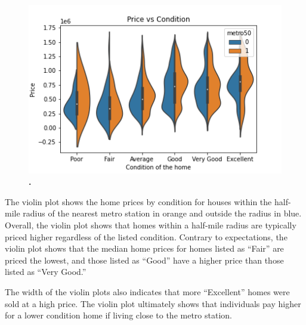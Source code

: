 \documentclass[12pt]{report}
\begin{document}
\begin{figure}[h]
\begin{center}
\includegraphics[width=130mm]{ConditionViolin.png}
\end{center}
\caption{\textbf{.}}
\label{fig:cndVio}
\end{figure}
The violin plot shows the home prices by condition for houses within the half-mile radius of the nearest metro station in orange and outside the radius in blue. Overall, the violin plot shows that homes within a half-mile radius are typically priced higher regardless of the listed condition. Contrary to expectations, the violin plot shows that the median home prices for homes listed as “Fair” are priced the lowest, and those listed as “Good” have a higher price than those listed as “Very Good.” 

The width of the violin plots also indicates that more “Excellent” homes were sold at a high price. The violin plot ultimately shows that individuals pay higher for a lower condition home if living close to the metro station. 
\clearpage
\end{document}
